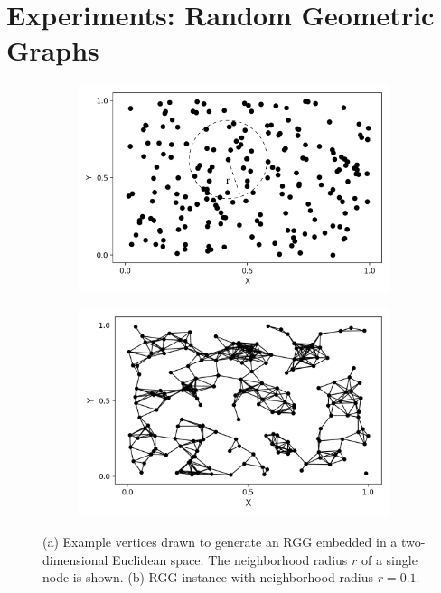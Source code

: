 \chapter{Experiments: Random Geometric Graphs}
\label{ch:rgg}

\begin{figure}[t]
  \centering
  \begin{subfigure}{.47\textwidth}
    \centering
    \includegraphics[width=1.0\linewidth]{figures/RGG-example.png}
    \caption{}
    \label{fig:rgg-example-a}
  \end{subfigure}
  \begin{subfigure}{.49\textwidth}
    \centering
    \includegraphics[width=1.0\linewidth]{figures/RGG-example-connected.png}
    \caption{}
    \label{fig:rgg-example-b}
  \end{subfigure}
  \caption{
    (a) Example vertices drawn to generate an RGG embedded in a two-dimensional
Euclidean space. The neighborhood radius $r$ of a single node is shown. (b) RGG
instance with neighborhood radius $r = 0.1$.
  }
  \label{fig:rgg-example}
\end{figure}

